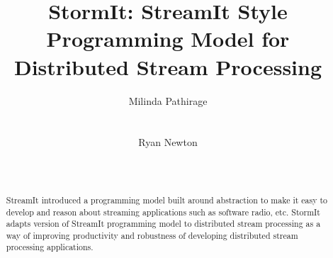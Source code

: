 \documentclass{sig-alternate}
\begin{document}
%

\title{StormIt: StreamIt Style Programming Model for Distributed Stream Processing}


\author{
\alignauthor
Milinda Pathirage\\
       \\
       \\
\alignauthor
Ryan Newton\\
       \\
       \\
}

\maketitle
\begin{abstract}
  StreamIt introduced a programming model built around  abstraction to make it easy to
  develop and reason about streaming applications such as software radio, etc. StormIt adapts
   version of StreamIt programming model to distributed stream processing as a way of
  improving productivity and robustness of developing distributed stream processing applications.
\end{abstract}
\end{document}
